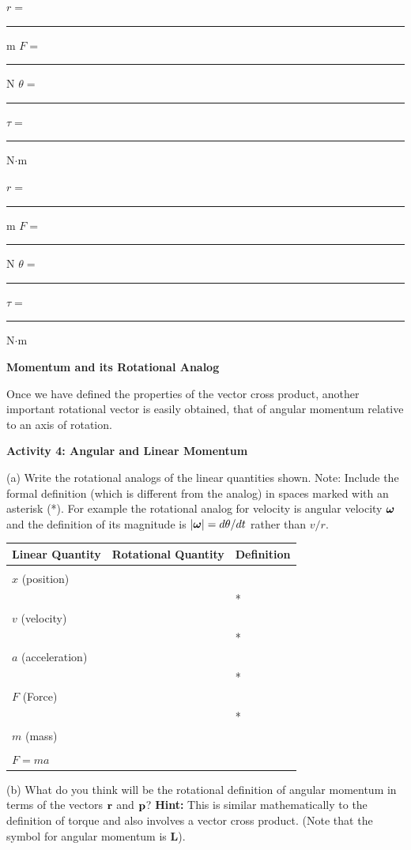 $r =$ \rule{0.5in}{0.1pt} m \hfill{}$F =$ 
\rule{0.5in}{0.1pt} N \hfill{}\( \theta  =\)
 \rule{0.5in}{0.1pt} \hfill{}\( \tau  =\)  \rule{0.5in}{0.1pt} N\( \cdot  \)m 
\vspace{5mm}

$r = $\rule{0.5in}{0.1pt} m \hfill{}$F =$ \rule{0.5in}{0.1pt} N \hfill{}
\( \theta = \)
\rule{0.5in}{0.1pt} \hfill{}\( \tau  =\)  \rule{0.5in}{0.1pt} N\( \cdot  \)m
\vspace{5mm}

\textbf{Momentum and its Rotational Analog} 

Once we have defined the properties of the vector cross product, another important
rotational vector is easily obtained, that of angular momentum relative to an
axis of rotation. 

\textbf{Activity 4: Angular and Linear Momentum }

(a) Write the rotational analogs of the linear quantities shown. Note: Include
the formal definition (which is different from the analog) in spaces marked
with an asterisk ({*}). For example the rotational analog for velocity is angular velocity \( \mbox{\boldmath$\omega$}  \) and the definition of its magnitude is \( |
\mbox{\boldmath$\omega$}  |
= d \theta  /dt\) rather than $v/r$.

\vspace{0.3cm}
{\centering \begin{tabular}{|p{5cm}|p{5cm}|p{5cm}|}
\hline 
Linear Quantity&
Rotational Quantity&
Definition\\
\hline 
\hline 
&
&
\\
$x$ (position) &
&
\\
\hline 
&
&
{*}\\
$v$ (velocity) &
&
\\
\hline 
&
&
{*}\\
$a$ (acceleration) &
&
\\
\hline 
&
&
{*}\\
$F$ (Force) &
&
\\
\hline 
&
&
{*}\\
$m$ (mass) &
&
\\
\hline 
&
&
\\
$F = ma$&
&
\\
\hline 
\end{tabular}\par}
\vspace{0.3cm}

(b) What do you think will be the rotational definition of angular momentum
in terms of the vectors \( {\bf r} \) and \( {\bf p} \)?
\textbf{Hint:} This is similar mathematically to the definition of torque and
also involves a vector cross product. (Note that the symbol for angular momentum is \textbf{L}).
\vspace{20mm}

